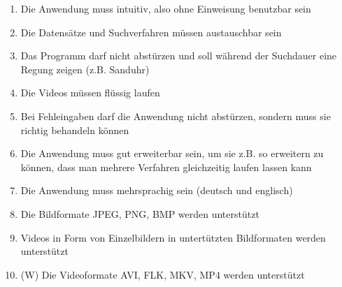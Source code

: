 \begin{enumerate}[label=\bfseries /NF \arabic*0/]
  \item Die Anwendung muss intuitiv, also ohne Einweisung benutzbar sein
  \item Die Datensätze und Suchverfahren müssen austauschbar sein
  \item Das Programm darf nicht abstürzen und soll während der Suchdauer eine Regung zeigen (z.B. Sanduhr)
  \item Die Videos müssen flüssig laufen
  \item Bei Fehleingaben darf die Anwendung nicht abstürzen, sondern muss sie richtig behandeln können
  \item Die Anwendung muss gut erweiterbar sein, um sie z.B. so erweitern zu können, dass man mehrere Verfahren gleichzeitig laufen lassen kann
  \item Die Anwendung muss mehrsprachig sein (deutsch und englisch)
	\item Die Bildformate JPEG, PNG, BMP werden unterst\"utzt
	\item Videos in Form von Einzelbildern in untert\"utzten Bildformaten werden unterst\"utzt
	\item (W) Die Videoformate AVI, FLK, MKV, MP4 werden unterst\"utzt
\end{enumerate}
